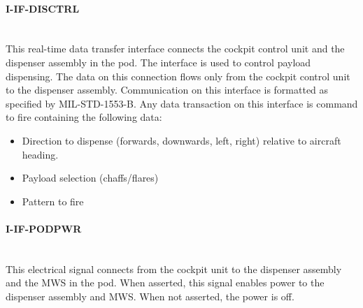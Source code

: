  \paragraph{I-IF-DISCTRL}\mbox{}\\
This real-time data transfer interface connects the cockpit control unit and the dispenser assembly in the pod. The interface is used to control payload dispensing.
The data on this connection flows only from the cockpit control unit to the dispenser assembly. Communication on this interface is formatted as specified by MIL-STD-1553-B. Any data transaction on this interface is command to fire containing the following data:
  \begin{itemize}
 \item Direction to dispense (forwards, downwards, left, right) relative to aircraft heading. 
 \item Payload selection (chaffs/flares)
 \item Pattern to fire
 \end{itemize}
\paragraph{I-IF-PODPWR}\mbox{}\\
This electrical signal connects from the cockpit unit to the dispenser assembly and the MWS in the pod. When asserted, this signal enables power to the dispenser assembly and MWS. When not asserted, the power is off.
